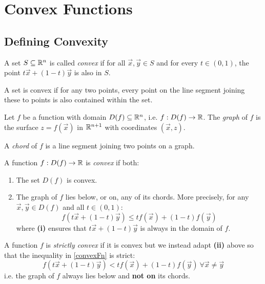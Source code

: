 \documentclass[../main.tex]{subfiles}
\begin{document}
\section{Convex Functions}
\subsection{Defining Convexity}
\begin{definition}
  A set $S \subseteq \mathbb{R}^{n}$ is called \textit{convex} if for all $\vec{x}, \vec{y} \in S$ and for every $t \in (0, 1)$, the point $t \vec{x} + (1 - t)\vec{y}$ is also in $S$.
\end{definition}
\begin{remark}[Intuition]
  A set is convex if for any two points, every point on the line segment joining these to points is also contained within the set.
\end{remark}
\begin{definition}[Graph]
  Let $f$ be a function with domain $D(f) \subseteq \mathbb{R}^{n}$, i.e. $f: D(f) \to \mathbb{R}$.
  The \textit{graph} of $f$ is the surface $z = f(\vec{x})$ in $\mathbb{R}^{n + 1}$ with coordinates $(\vec{x}, z)$.
\end{definition}
\begin{definition}[Chord]
  A \textit{chord} of $f$ is a line segment joining two points on a graph.
\end{definition}
\begin{definition}
  A function $f: D(f) \to \mathbb{R}$ is \textit{convex} if both:
  \begin{enumerate}
    \item The set $D(f)$ is convex.
    \item The graph of $f$ lies below, or on, any of its chords.
      More precisely, for any $\vec{x}, \vec{y} \in D(f)$ and all $t \in (0, 1)$:
      \begin{equation}
        f(t \vec{x} + (1 - t)\vec{y}) \leq t f(\vec{x}) + (1 - t) f(\vec{y}) \label{convexFn}
      \end{equation}
      where \textbf{(i)} ensures that $t\vec{x} + (1 - t)\vec{y}$ is always in the domain of $f$.
  \end{enumerate}
\end{definition}
\begin{definition}
  A function $f$ is \textit{strictly convex} if it is convex but we instead adapt \textbf{(ii)} above so that the inequality in \cref{convexFn} is strict:
  \begin{equation}
    f(t \vec{x} + (1 - t)\vec{y}) < t f(\vec{x}) + (1 - t) f(\vec{y})\ \forall \vec{x} \neq \vec{y} \label{strictConvexFn}
  \end{equation}
  i.e. the graph of $f$ always lies below and \textbf{not on} its chords.
\end{definition}
\end{document}
